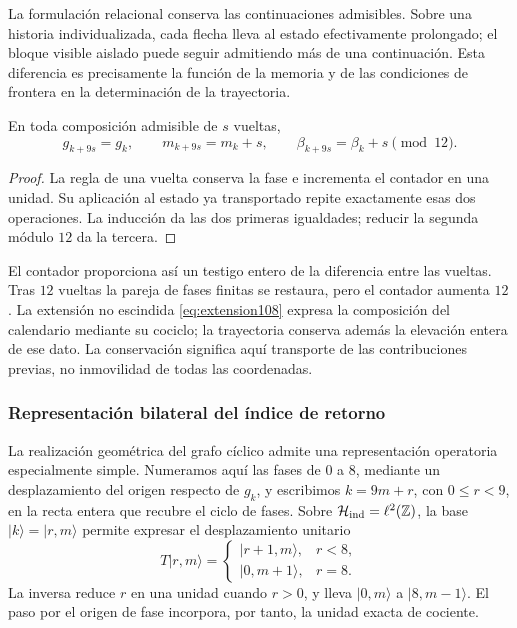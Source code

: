 La formulación relacional conserva las continuaciones admisibles. Sobre
una historia individualizada, cada flecha lleva al estado efectivamente
prolongado; el bloque visible aislado puede seguir admitiendo más de una
continuación. Esta diferencia es precisamente la función de la memoria y
de las condiciones de frontera en la determinación de la trayectoria.

\begin{proposition}
\label{mono-ampl:vueltas}
En toda composición admisible de \(s\) vueltas,
\[
 g_{k+9s}=g_k,\qquad m_{k+9s}=m_k+s,\qquad
 \beta_{k+9s}=\beta_k+s\pmod{12}.
\]
\end{proposition}
\begin{proof}
La regla de una vuelta conserva la fase e incrementa el contador en una
unidad. Su aplicación al estado ya transportado repite exactamente esas
dos operaciones. La inducción da las dos primeras igualdades; reducir la
segunda módulo \(12\) da la tercera.
\end{proof}

El contador proporciona así un testigo entero de la diferencia entre las
vueltas. Tras \(12\) vueltas la pareja de fases finitas se restaura, pero
el contador aumenta \(12\). La extensión no escindida
\eqref{eq:extension108} expresa la composición del calendario mediante su
cociclo; la trayectoria conserva además la elevación entera de ese dato.
La conservación significa aquí transporte de las contribuciones previas,
no inmovilidad de todas las coordenadas.

\subsubsection{Representación bilateral del índice de retorno}

La realización geométrica del grafo cíclico admite una representación
operatoria especialmente simple. Numeramos aquí las fases de \(0\) a
\(8\), mediante un desplazamiento del origen respecto de \(g_k\), y
escribimos \(k=9m+r\), con \(0\leq r<9\), en la recta entera
que recubre el ciclo de fases. Sobre
\(\mathcal H_{\rm ind}=\ell^2(\mathbb Z)\), la base
\(|k\rangle=|r,m\rangle\) permite expresar el desplazamiento unitario
\[
 T|r,m\rangle=
 \begin{cases}
 |r+1,m\rangle,&r<8,\\
 |0,m+1\rangle,&r=8.
 \end{cases}
\]
La inversa reduce \(r\) en una unidad cuando \(r>0\), y lleva
\(|0,m\rangle\) a \(|8,m-1\rangle\). El paso por el origen de fase
incorpora, por tanto, la unidad exacta de cociente.

